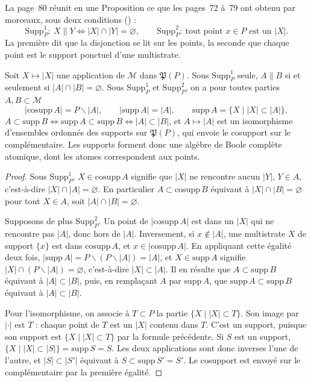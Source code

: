 La page~80 réunit en une Proposition ce que les pages~72 à~79 ont obtenu par morceaux, sous deux conditions () :
\[
\mathrm{Supp}^1_P : \ X \parallel Y \iff |X| \cap |Y| = \varnothing , \qquad \mathrm{Supp}^2_P : \ \text{tout point } x \in P \text{ est un } |X| .
\]
La première dit que la disjonction se lit sur les points, la seconde que chaque point est le support ponctuel d'une multistrate.

\begin{encadre}
\begin{theoreme}
Soit $X \mapsto |X|$ une application de $\mathcal M$ dans $\mathfrak P(P)$. Sous $\mathrm{Supp}^1_P$ seule, $A \parallel B$ si et seulement si $|A| \cap |B| = \varnothing$. Sous $\mathrm{Supp}^1_P$ et $\mathrm{Supp}^2_P$, on a pour toutes parties $A, B \subset \mathcal M$
\[
|\mathrm{cosupp}\, A| = P \smallsetminus |A| , \qquad |\mathrm{supp}\, A| = |A| , \qquad \mathrm{supp}\, A = \{X \mid |X| \subset |A|\} ,
\]
$A \subset \mathrm{supp}\, B \iff \mathrm{supp}\, A \subset \mathrm{supp}\, B \iff |A| \subset |B|$, et $A \mapsto |A|$ est un isomorphisme d'ensembles ordonnés des supports sur $\mathfrak P(P)$, qui envoie le cosupport sur le complémentaire. Les supports forment donc une algèbre de Boole complète atomique, dont les atomes correspondent aux points.
\end{theoreme}
\end{encadre}

\begin{proof}
Sous $\mathrm{Supp}^1_P$, $X \in \mathrm{cosupp}\, A$ signifie que $|X|$ ne rencontre aucun $|Y|$, $Y \in A$, c'est-à-dire $|X| \cap |A| = \varnothing$. En particulier $A \subset \mathrm{cosupp}\, B$ équivaut à $|X| \cap |B| = \varnothing$ pour tout $X \in A$, soit $|A| \cap |B| = \varnothing$.

Supposons de plus $\mathrm{Supp}^2_P$. Un point de $|\mathrm{cosupp}\, A|$ est dans un $|X|$ qui ne rencontre pas $|A|$, donc hors de $|A|$. Inversement, si $x \notin |A|$, une multistrate $X$ de support $\{x\}$ est dans $\mathrm{cosupp}\, A$, et $x \in |\mathrm{cosupp}\, A|$. En appliquant cette égalité deux fois, $|\mathrm{supp}\, A| = P \smallsetminus (P \smallsetminus |A|) = |A|$, et $X \in \mathrm{supp}\, A$ signifie $|X| \cap (P \smallsetminus |A|) = \varnothing$, c'est-à-dire $|X| \subset |A|$. Il en résulte que $A \subset \mathrm{supp}\, B$ équivaut à $|A| \subset |B|$, puis, en remplaçant $A$ par $\mathrm{supp}\, A$, que $\mathrm{supp}\, A \subset \mathrm{supp}\, B$ équivaut à $|A| \subset |B|$.

Pour l'isomorphisme, on associe à $T \subset P$ la partie $\{X \mid |X| \subset T\}$. Son image par $|\cdot|$ est $T$ : chaque point de $T$ est un $|X|$ contenu dans $T$. C'est un support, puisque son support est $\{X \mid |X| \subset T\}$ par la formule précédente. Si $S$ est un support, $\{X \mid |X| \subset |S|\} = \mathrm{supp}\, S = S$. Les deux applications sont donc inverses l'une de l'autre, et $|S| \subset |S'|$ équivaut à $S \subset \mathrm{supp}\, S' = S'$. Le cosupport est envoyé sur le complémentaire par la première égalité.
\end{proof}

